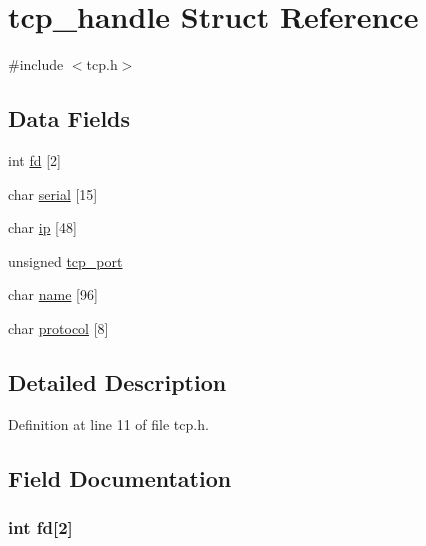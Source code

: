 \hypertarget{structtcp__handle}{}\section{tcp\+\_\+handle Struct Reference}
\label{structtcp__handle}


{\ttfamily \#include $<$tcp.\+h$>$}

\subsection*{Data Fields}
\begin{DoxyCompactItemize}
\item 
int \hyperlink{structtcp__handle_a62d2d983a3da1fde907ff0f255bf4956}{fd} \mbox{[}2\mbox{]}
\item 
char \hyperlink{structtcp__handle_aad443e9b7cf91034f8385c4e5f8d39b7}{serial} \mbox{[}15\mbox{]}
\item 
char \hyperlink{structtcp__handle_a44c1111ee3b512b772167025f08a2acc}{ip} \mbox{[}48\mbox{]}
\item 
unsigned \hyperlink{structtcp__handle_a9c359bbbf5b11a9dc290584ddbbb333e}{tcp\+\_\+port}
\item 
char \hyperlink{structtcp__handle_afeeb8d215b9c0d1c7ad75b1f2e6bc22d}{name} \mbox{[}96\mbox{]}
\item 
char \hyperlink{structtcp__handle_afde215174ef5fdedb544b1c148b51220}{protocol} \mbox{[}8\mbox{]}
\end{DoxyCompactItemize}


\subsection{Detailed Description}


Definition at line 11 of file tcp.\+h.



\subsection{Field Documentation}
\hypertarget{structtcp__handle_a62d2d983a3da1fde907ff0f255bf4956}{}
\subsubsection[{fd}]{\setlength{\rightskip}{0pt plus 5cm}int fd\mbox{[}2\mbox{]}}\label{structtcp__handle_a62d2d983a3da1fde907ff0f255bf4956}


